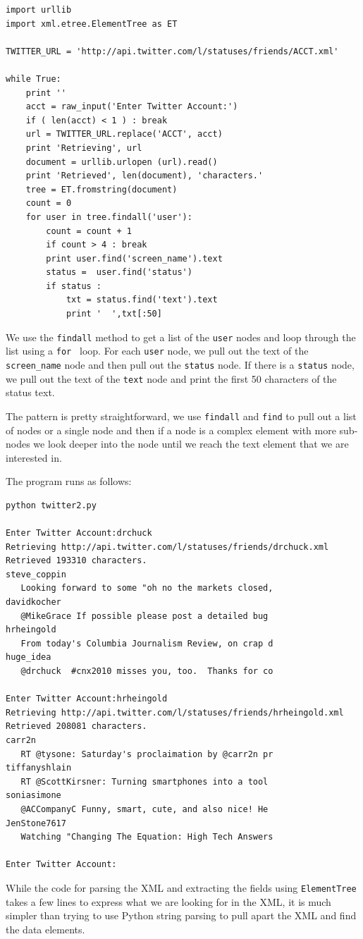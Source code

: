 \documentclass[10pt]{book}
\begin{document}
\beforeverb
\begin{verbatim}
import urllib
import xml.etree.ElementTree as ET

TWITTER_URL = 'http://api.twitter.com/l/statuses/friends/ACCT.xml'

while True:
    print ''
    acct = raw_input('Enter Twitter Account:')
    if ( len(acct) < 1 ) : break
    url = TWITTER_URL.replace('ACCT', acct)
    print 'Retrieving', url
    document = urllib.urlopen (url).read()
    print 'Retrieved', len(document), 'characters.' 
    tree = ET.fromstring(document)
    count = 0
    for user in tree.findall('user'):
        count = count + 1
        if count > 4 : break
        print user.find('screen_name').text
        status =  user.find('status')
        if status : 
            txt = status.find('text').text
            print '  ',txt[:50]
\end{verbatim}
\afterverb
%
We use the {\tt findall} method to get a list of the {\tt user} 
nodes and loop through the list using a {\tt for } loop.  
For each {\tt user} node, we pull out the text of the \verb"screen_name" node
and then pull out the {\tt status} node.   If there is a {\tt status}
node, we pull out the text of the {\tt text} node and print the first 50 
characters of the status text.

The pattern is pretty straightforward, we use {\tt findall} and {\tt find}
to pull out a list of nodes or a single node and then if a node is a complex
element with more sub-nodes we look deeper into the node until we reach the 
text element that we are interested in.

The program runs as follows:

\beforeverb
\begin{verbatim}
python twitter2.py 

Enter Twitter Account:drchuck
Retrieving http://api.twitter.com/l/statuses/friends/drchuck.xml
Retrieved 193310 characters.
steve_coppin
   Looking forward to some "oh no the markets closed,
davidkocher
   @MikeGrace If possible please post a detailed bug 
hrheingold
   From today's Columbia Journalism Review, on crap d
huge_idea
   @drchuck  #cnx2010 misses you, too.  Thanks for co

Enter Twitter Account:hrheingold
Retrieving http://api.twitter.com/l/statuses/friends/hrheingold.xml
Retrieved 208081 characters.
carr2n
   RT @tysone: Saturday's proclaimation by @carr2n pr
tiffanyshlain
   RT @ScottKirsner: Turning smartphones into a tool 
soniasimone
   @ACCompanyC Funny, smart, cute, and also nice! He 
JenStone7617
   Watching "Changing The Equation: High Tech Answers

Enter Twitter Account:
\end{verbatim}
\afterverb
%
While the code for parsing the XML and extracting the fields
using {\tt ElementTree} takes a few lines to express what 
we are looking for in the XML, it is much simpler than trying 
to use Python string parsing to pull apart the XML and find 
the data elements.
\end{document}

